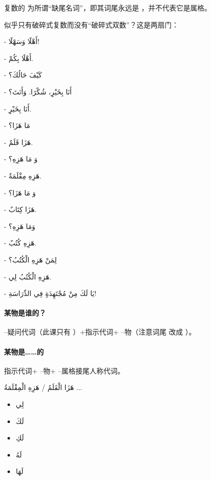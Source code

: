 复数的 为所谓``缺尾名词''，即其词尾永远是 ，并不代表它是属格。

\begin{note}
    似乎只有破碎式复数而没有``破碎式双数''？这是两扇门：
\end{note}

\begin{Arabic}
    - أَهْلََا وَسَهْلََا!

    - أَهْلََا بِكُمْ.

    - كَيْفَ حَالُكَ؟

    - أَنَا بِخَيْرِِ، شُكْرََا. وَأَنَتَ؟

    - أَنَا بِخَيْرِِ.

    - مَا هَزَا؟

    - هَزَا قَلَمٌ.

    - وَ مَا هَزِهِ؟

    - هَزِهِ مِقْلَمَةٌ.

    - وَ مَا هَزَا؟

    - هَزَا كِتَابٌ.

    - وَمَا هَزِهِ؟

    - هَزِهِ كُتُبٌ.

    - لِمَنْ هَزِهِ الْكُتُبُ؟

    - هَزِهِ الْكُتُبُ لِي.

    - يَا لَكَ مِنْ مُجْتَهِدَةِِ فِي الدِّرَاسَةِ!
\end{Arabic}

\paragraph{某物是谁的？} --疑问代词（此课只有 ）+指示代词+ --物（注意词尾 改成 ）。

\paragraph{某物是……的} 指示代词+ --物+ --属格接尾人称代词。

\begin{Arabic}
    هَزَا الْقَلَمُ / هَزِهِ الْمِقْلَمَةُ ...
    \begin{itemize}
        \item لِي
        \item لَكَ
        \item لَكِ
        \item لَهُ
        \item لَهَا
    \end{itemize}
\end{Arabic}


